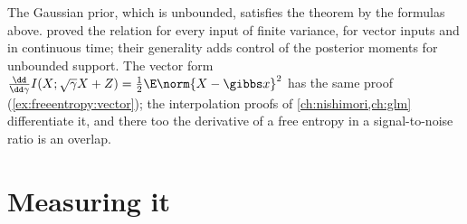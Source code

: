 \begin{refsection}
The Gaussian prior, which is unbounded, satisfies the theorem by the formulas above. \Textcite{GuoShamaiVerdu2005} proved the relation for every input of finite variance, for vector inputs and in continuous time; their generality adds control of the posterior moments for unbounded support. The vector form $\frac{\dd}{\dd\gamma}I(X;\sqrt\gamma X+Z)=\frac12\E\norm{X-\gibbs x}^2$ has the same proof (\cref{ex:freeentropy:vector}); the interpolation proofs of \cref{ch:nishimori,ch:glm} differentiate it, and there too the derivative of a free entropy in a signal-to-noise ratio is an overlap.

\section{Measuring it}\label{sec:freeentropy:measuring}


\end{refsection}
